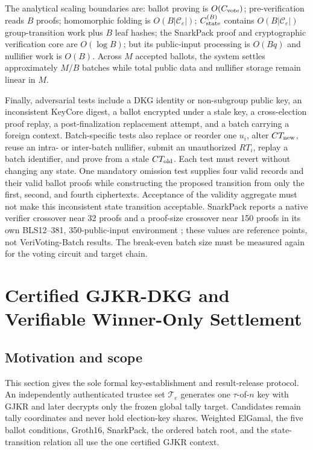 \documentclass[pdflatex,sn-mathphys-num]{sn-jnl}%
\theoremstyle{thmstyleone}%
\theoremstyle{thmstyletwo}%
\theoremstyle{thmstylethree}%
\begin{document}
The analytical scaling boundaries are: ballot proving is $O(C_{\rm vote})$; pre-verification reads $B$ proofs; homomorphic folding is $O(B|\mathcal C_e|)$; $C_{\rm state}^{(B)}$ contains $O(B|\mathcal C_e|)$ group-transition work plus $B$ leaf hashes; the SnarkPack proof and cryptographic verification core are $O(\log B)$; but its public-input processing is $O(Bq)$ and nullifier work is $O(B)$. Across $M$ accepted ballots, the system settles approximately $M/B$ batches while total public data and nullifier storage remain linear in $M$.

Finally, adversarial tests include a DKG identity or non-subgroup public key,
an inconsistent KeyCore digest, a ballot encrypted under a stale key, a
cross-election proof replay, a post-finalization replacement attempt, and a
batch carrying a foreign context. Batch-specific tests also replace or reorder
one $u_i$, alter $CT_{\rm new}$, reuse an intra- or inter-batch nullifier,
submit an unauthorized $RT_i$, replay a batch identifier, and prove from a
stale $CT_{\rm old}$. Each test must revert without changing any state.
One mandatory omission test supplies four valid records and their valid ballot
proofs while constructing the proposed transition from only the first, second,
and fourth ciphertexts.  Acceptance of the validity aggregate must not make
this inconsistent state transition acceptable.
SnarkPack reports a native verifier crossover near 32 proofs and a proof-size
crossover near 150 proofs in its own BLS12--381, 350-public-input environment
\cite{bib128}; these values are reference points, not VeriVoting-Batch results.
The break-even batch size must be measured again for the voting circuit and
target chain.

\section{Certified GJKR-DKG and Verifiable Winner-Only Settlement}
\label{sec:threshold-mode}

\subsection{Motivation and scope}
\label{subsec:threshold-scope}

This section gives the sole formal key-establishment and result-release protocol.
An independently authenticated trustee set $\mathcal T_e$ generates one
$\tau$-of-$n$ key with GJKR and later decrypts only the frozen global tally
target.  Candidates remain tally coordinates and never hold election-key
shares.  Weighted ElGamal, the five ballot conditions, Groth16, SnarkPack, the
ordered batch root, and the state-transition relation all use the one certified
GJKR context.
\end{document}
